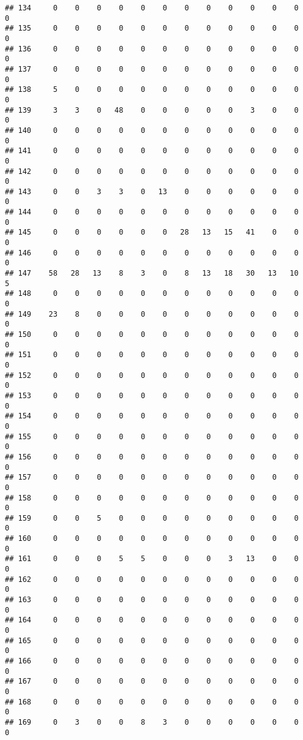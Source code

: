 \documentclass[]{article}
\begin{document}
\begin{verbatim}
## 134     0    0    0    0    0    0    0    0    0    0    0    0    0
## 135     0    0    0    0    0    0    0    0    0    0    0    0    0
## 136     0    0    0    0    0    0    0    0    0    0    0    0    0
## 137     0    0    0    0    0    0    0    0    0    0    0    0    0
## 138     5    0    0    0    0    0    0    0    0    0    0    0    0
## 139     3    3    0   48    0    0    0    0    0    3    0    0    0
## 140     0    0    0    0    0    0    0    0    0    0    0    0    0
## 141     0    0    0    0    0    0    0    0    0    0    0    0    0
## 142     0    0    0    0    0    0    0    0    0    0    0    0    0
## 143     0    0    3    3    0   13    0    0    0    0    0    0    0
## 144     0    0    0    0    0    0    0    0    0    0    0    0    0
## 145     0    0    0    0    0    0   28   13   15   41    0    0    0
## 146     0    0    0    0    0    0    0    0    0    0    0    0    0
## 147    58   28   13    8    3    0    8   13   18   30   13   10    5
## 148     0    0    0    0    0    0    0    0    0    0    0    0    0
## 149    23    8    0    0    0    0    0    0    0    0    0    0    0
## 150     0    0    0    0    0    0    0    0    0    0    0    0    0
## 151     0    0    0    0    0    0    0    0    0    0    0    0    0
## 152     0    0    0    0    0    0    0    0    0    0    0    0    0
## 153     0    0    0    0    0    0    0    0    0    0    0    0    0
## 154     0    0    0    0    0    0    0    0    0    0    0    0    0
## 155     0    0    0    0    0    0    0    0    0    0    0    0    0
## 156     0    0    0    0    0    0    0    0    0    0    0    0    0
## 157     0    0    0    0    0    0    0    0    0    0    0    0    0
## 158     0    0    0    0    0    0    0    0    0    0    0    0    0
## 159     0    0    5    0    0    0    0    0    0    0    0    0    0
## 160     0    0    0    0    0    0    0    0    0    0    0    0    0
## 161     0    0    0    5    5    0    0    0    3   13    0    0    0
## 162     0    0    0    0    0    0    0    0    0    0    0    0    0
## 163     0    0    0    0    0    0    0    0    0    0    0    0    0
## 164     0    0    0    0    0    0    0    0    0    0    0    0    0
## 165     0    0    0    0    0    0    0    0    0    0    0    0    0
## 166     0    0    0    0    0    0    0    0    0    0    0    0    0
## 167     0    0    0    0    0    0    0    0    0    0    0    0    0
## 168     0    0    0    0    0    0    0    0    0    0    0    0    0
## 169     0    3    0    0    8    3    0    0    0    0    0    0    0

\end{verbatim}
\end{document}
